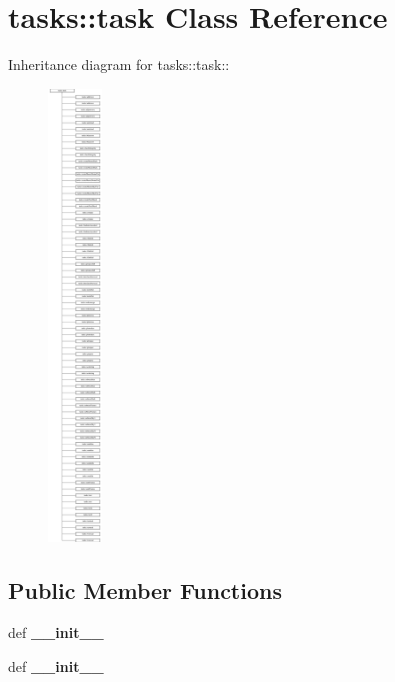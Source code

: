 \section{tasks::task Class Reference}
\label{classtasks_1_1task}
Inheritance diagram for tasks::task::\begin{figure}[H]
\begin{center}
\leavevmode
\includegraphics[height=12cm]{classtasks_1_1task}
\end{center}
\end{figure}
\subsection*{Public Member Functions}
\begin{CompactItemize}
\item 
def \textbf{\_\-\_\-init\_\-\_\-}\label{classtasks_1_1task_6c6d93968e1985dcdeb9a427e5887caf}

\item 
def \textbf{\_\-\_\-init\_\-\_\-}\label{classtasks_1_1task_6c6d93968e1985dcdeb9a427e5887caf}

\end{CompactItemize}
